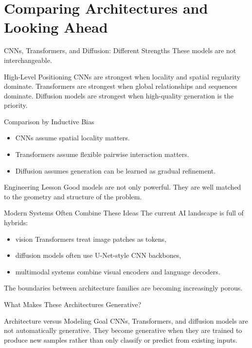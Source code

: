 \documentclass[12pt]{beamer}
\begin{document}
\section{Comparing Architectures and Looking Ahead}

\begin{frame}{CNNs, Transformers, and Diffusion: Different Strengths}
  These models are not interchangeable.

  \begin{conceptbox}{High-Level Positioning}
    CNNs are strongest when locality and spatial regularity dominate. Transformers are strongest when global relationships and sequences dominate. Diffusion models are strongest when high-quality generation is the priority.
  \end{conceptbox}
\end{frame}

\begin{frame}{Comparison by Inductive Bias}
  \begin{itemize}
    \item CNNs assume spatial locality matters.
    \item Transformers assume flexible pairwise interaction matters.
    \item Diffusion assumes generation can be learned as gradual refinement.
  \end{itemize}

  \begin{conceptbox}{Engineering Lesson}
    Good models are not only powerful. They are well matched to the geometry and structure of the problem.
  \end{conceptbox}
\end{frame}

\begin{frame}{Modern Systems Often Combine These Ideas}
  The current AI landscape is full of hybrids:
  \begin{itemize}
    \item vision Transformers treat image patches as tokens,
    \item diffusion models often use U-Net-style CNN backbones,
    \item multimodal systems combine visual encoders and language decoders.
  \end{itemize}

  The boundaries between architecture families are becoming increasingly porous.
\end{frame}

\begin{frame}{What Makes These Architectures Generative?}
  \begin{conceptbox}{Architecture versus Modeling Goal}
    CNNs, Transformers, and diffusion models are not automatically generative. They become generative when they are trained to produce new samples rather than only classify or predict from existing inputs.
  \end{conceptbox}

  
 
  
\end{frame}
\end{document}
